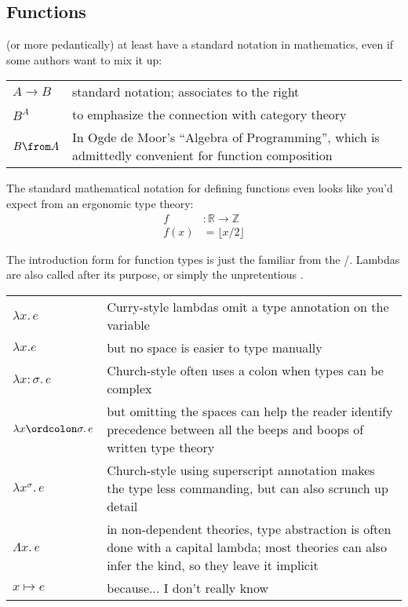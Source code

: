 \documentclass[11pt]{article} %
\theoremstyle{definition}
\theoremstyle{remark}
\begin{document}
\subsection{Functions}
\label{subsec:function-types}

 (or  more pedantically) at least have a standard notation in mathematics, even if some authors want to mix it up:
\begin{center}
\renewcommand{\arraystretch}{1.2}
\begin{tabular}{lp{10cm}}
$A \to B$ & standard notation; associates to the right \\
$B^A$ & to emphasize the connection with category theory \\
$B \from A$ & In Ogde de Moor's ``Algebra of Programming'', which is admittedly convenient for function composition \\
\end{tabular}
\end{center}
The standard mathematical notation for defining functions even looks like you'd expect from an ergonomic type theory:
\begin{align*}
f &: \mathbb R \to \mathbb Z \\
f(x) &= \lfloor x/2 \rfloor
\end{align*}

The introduction form for function types is just the familiar  from the \lambdaCalculus/. Lambdas are also called  after its purpose, or simply the unpretentious .
\begin{center}
\renewcommand{\arraystretch}{1.2}
\begin{tabular}{lp{10cm}}
$\lambda x.\,e$ & Curry-style lambdas omit a type annotation on the variable \\
$\lambda x.e$ & but no space is easier to type manually \\
$\lambda x:\sigma.\,e$ & Church-style often uses a colon when types can be complex \\
$\lambda x\ordcolon\sigma.\,e$
  & but omitting the spaces can help the reader identify precedence between all the beeps and boops of written type theory \\
$\lambda x^\sigma.\,e$
  & Church-style using superscript annotation makes the type less commanding, but can also scrunch up detail \\
$\Lambda x.\,e$
  & in non-dependent theories, type abstraction is often done with a capital lambda; most theories can also infer the kind, so they leave it implicit \\
$x \mapsto e$
  & \cite{hottbook} because... I don't really know \\
\end{tabular}
\end{center}
\end{document}

